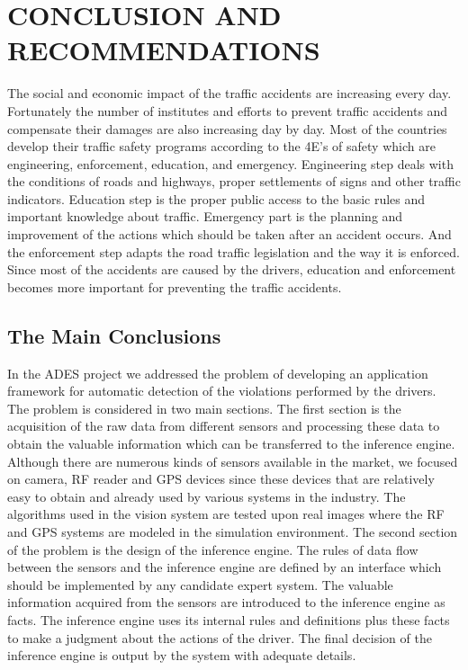 \documentclass[a4paper,oneside,12pt]{report}
\begin{document}
\chapter{CONCLUSION AND RECOMMENDATIONS} 
\label{chapconc}
The social and economic impact of the traffic accidents are increasing every day. Fortunately the number of institutes and efforts to prevent traffic accidents and compensate their damages are also increasing day by day. Most of the countries develop their traffic safety programs according to the 4E's of safety which are engineering, enforcement, education, and emergency. Engineering step deals with the conditions of roads and highways, proper settlements of signs and other traffic indicators. Education step is the proper public access to the basic rules and important knowledge about traffic. Emergency part is the planning and improvement of the actions which should be taken after an accident occurs. And the enforcement step adapts the road traffic legislation and the way it is enforced. Since most of the accidents are caused by the drivers, education and enforcement becomes more important for preventing the traffic accidents. 	

\section{The Main Conclusions}

In the ADES project we addressed the problem of developing an application framework for automatic detection of the violations performed by the drivers. The problem is considered in two main sections. The first section is the acquisition  of the raw data from different sensors and processing these data to obtain the valuable information which can be transferred to the inference engine. Although there are numerous kinds of sensors available in the market, we focused on camera, RF reader and GPS devices since these devices that are relatively easy to obtain and already used by various systems in the industry. The algorithms used in the vision system are tested upon real images where the RF and GPS systems are modeled in the simulation environment. The second section of the problem is the design of the inference engine. The rules of data flow between the sensors and the inference engine are defined by an interface which should be implemented by any candidate expert system. The valuable information acquired from the sensors are introduced to the inference engine as facts. The inference engine uses its internal rules and definitions plus these facts to make a judgment about the actions of the driver. The final decision of the inference engine is output by the system with adequate details.
\end{document}
